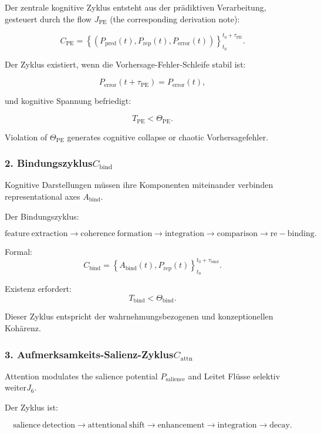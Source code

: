 Der zentrale kognitive Zyklus entsteht aus der prädiktiven Verarbeitung, gesteuert durch
the flow $J_{\mathrm{PE}}$ (the corresponding derivation note):

\[
 C_{\mathrm{PE}} = 
 \left\{
   (P_{\mathrm{pred}}(t),
    P_{\mathrm{rep}}(t),
    P_{\mathrm{error}}(t))
 \right\}_{t_0}^{t_0+\tau_{\mathrm{PE}}}.
\]

Der Zyklus existiert, wenn die Vorhersage-Fehler-Schleife stabil ist:

\[
 P_{\mathrm{error}}(t+\tau_{\mathrm{PE}}) = P_{\mathrm{error}}(t),
\]

und kognitive Spannung befriedigt:

\[
 T_{\mathrm{PE}} < \Theta_{\mathrm{PE}}.
\]

Violation of $\Theta_{\mathrm{PE}}$ generates cognitive collapse or chaotic
Vorhersagefehler.

\subsubsection{2. Bindungszyklus$C_{\mathrm{bind}}$}

Kognitive Darstellungen müssen ihre Komponenten miteinander verbinden
representational axes $A_{\mathrm{bind}}$.

Der Bindungszyklus:

\[
 \mathrm{feature\ extraction}
 \to
 \mathrm{coherence\ formation}
 \to
 \mathrm{integration}
 \to
 \mathrm{comparison}
 \to
 \mathrm{re-binding}.
\]

Formal:
\[
 C_{\mathrm{bind}} =
 \left\{
   A_{\mathrm{bind}}(t), P_{\mathrm{rep}}(t)
 \right\}_{t_0}^{t_0+\tau_{\mathrm{bind}}}.
\]

Existenz erfordert:
\[
 T_{\mathrm{bind}} < \Theta_{\mathrm{bind}}.
\]

Dieser Zyklus entspricht der wahrnehmungsbezogenen und konzeptionellen Kohärenz.

\subsubsection{3. Aufmerksamkeits-Salienz-Zyklus$C_{\mathrm{attn}}$}

Attention modulates the salience potential $P_{\mathrm{salience}}$ and
Leitet Flüsse selektiv weiter$J_6$.

Der Zyklus ist:

\[
  \mathrm{salience\ detection}
  \to
  \mathrm{attentional\ shift}
  \to
  \mathrm{enhancement}
  \to
  \mathrm{integration}
  \to
  \mathrm{decay}.
\]


